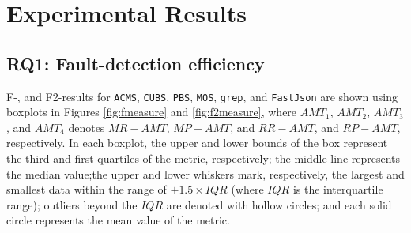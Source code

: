 \documentclass[10pt,journal,compsoc]{IEEEtran}
\begin{document}
\section{Experimental Results}
\label{sec:results}

\subsection{RQ1: Fault-detection efficiency}
\label{sec:rq1}

F-, and F2-results for \texttt{ACMS}, \texttt{CUBS}, \texttt{PBS}, \texttt{MOS}, \texttt{grep}, and \texttt{FastJson} are shown using boxplots in Figures \ref{fig:fmeasure} and \ref{fig:f2measure}, where $AMT_1$, $AMT_2$, $AMT_3$, and $AMT_4$ denotes $MR-AMT$, $MP-AMT$, and $RR-AMT$, and $RP-AMT$, respectively.
In each boxplot, the upper and lower bounds of the box represent the third and first quartiles of the metric, respectively;
the middle line represents the median value;the upper and lower whiskers mark, respectively, the largest and smallest data within the range of $\pm 1.5 \times IQR$ (where $IQR$ is the interquartile range); outliers beyond the  $IQR$ are denoted with hollow circles; and each solid circle represents the mean value of the metric.
\end{document}
